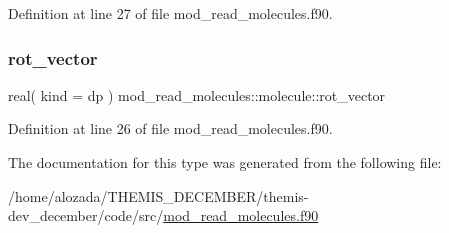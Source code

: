 Definition at line 27 of file mod\+\_\+read\+\_\+molecules.\+f90.

\mbox{\label{structmod__read__molecules_1_1molecule_abcd2948db172b5f24fde039b58d82d53}} 
\subsubsection{\texorpdfstring{rot\+\_\+vector}{rot\_vector}}
{\footnotesize\ttfamily real( kind = dp ) mod\+\_\+read\+\_\+molecules\+::molecule\+::rot\+\_\+vector}



Definition at line 26 of file mod\+\_\+read\+\_\+molecules.\+f90.



The documentation for this type was generated from the following file\+:\begin{DoxyCompactItemize}
\item 
/home/alozada/\+T\+H\+E\+M\+I\+S\+\_\+\+D\+E\+C\+E\+M\+B\+E\+R/themis-\/dev\+\_\+december/code/src/\hyperlink{mod__read__molecules_8f90}{mod\+\_\+read\+\_\+molecules.\+f90}\end{DoxyCompactItemize}
